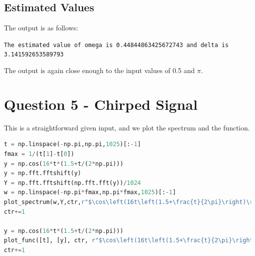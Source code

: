 \documentclass[12pt]{article}
\begin{document}
\subsection{Estimated Values}

The output is as follows:

\texttt{The estimated value of omega is 0.44844863425672743 and delta is 3.141592653589793}

The output is again close enough to the input values of 0.5 and $\pi$.
\pagebreak

\section{Question 5 - Chirped Signal}

This is a straightforward given input, and we plot the spectrum and the function.

\begin{lstlisting}[language=Python]
t = np.linspace(-np.pi,np.pi,1025)[:-1]
fmax = 1/(t[1]-t[0])
y = np.cos(16*t*(1.5+t/(2*np.pi)))
y = np.fft.fftshift(y)
Y = np.fft.fftshift(np.fft.fft(y))/1024
w = np.linspace(-np.pi*fmax,np.pi*fmax,1025)[:-1]
plot_spectrum(w,Y,ctr,r"$\cos\left(16t\left(1.5+\frac{t}{2\pi}\right)\right)$",type='linpts',xlims=[-50,50])
ctr+=1

y = np.cos(16*t*(1.5+t/(2*np.pi)))
plot_func([t], [y], ctr, r"$\cos\left(16t\left(1.5+\frac{t}{2\pi}\right)\right)$",save=True)
ctr+=1
\end{lstlisting}
\end{document}
